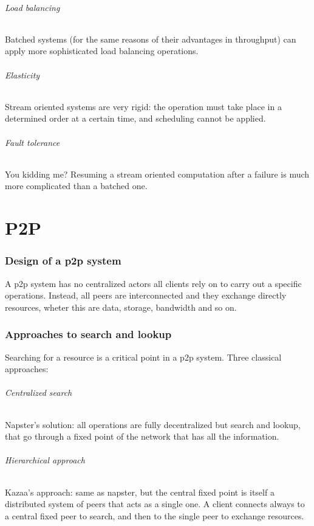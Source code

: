 \documentclass[10pt,a4paper]{article}
\begin{document}
				\paragraph{Load balancing}
					Batched systems (for the same reasons of their advantages in throughput) can apply more sophisticated load balancing operations.
				\paragraph{Elasticity}
					Stream oriented systems are very rigid: the operation must take place in a determined order at a certain time, and scheduling cannot be applied. 
				\paragraph{Fault tolerance}
					You kidding me? Resuming a stream oriented computation after a failure is much more complicated than a batched one.
					
	\part{P2P}
		\section{Design of a p2p system}
			A p2p system has no centralized actors all clients rely on to carry out a specific operations. Instead, all peers are interconnected and they exchange directly resources, wheter this are data, storage, bandwidth and so on. 
		
		\section{Approaches to search and lookup}
			Searching for a resource is a critical point in a p2p system. Three classical approaches:
			\paragraph{Centralized search}
				Napster's solution: all operations are fully decentralized but search and lookup, that go through a fixed point of the network that has all the information.
			\paragraph{Hierarchical approach}
				Kazaa's approach: same as napster, but the central fixed point is itself a distributed system of peers that acts as a single one. A client connects always to a central fixed peer to search, and then to the single peer to exchange resources.
\end{document}
